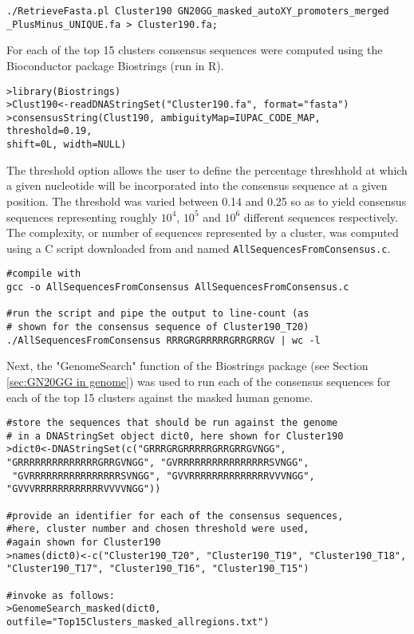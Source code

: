 \begin{small}\begin{lstlisting}
./RetrieveFasta.pl Cluster190 GN20GG_masked_autoXY_promoters_merged
_PlusMinus_UNIQUE.fa > Cluster190.fa;
\end{lstlisting}\end{small}

For each of the top 15 clusters consensus sequences were computed using the Bioconductor package Biostrings (run in R).

\begin{small}\begin{lstlisting}
>library(Biostrings)
>Clust190<-readDNAStringSet("Cluster190.fa", format="fasta") 
>consensusString(Clust190, ambiguityMap=IUPAC_CODE_MAP, threshold=0.19,
shift=0L, width=NULL) 
\end{lstlisting}\end{small}

The threshold option allows the user to define the percentage threshhold at which a given nucleotide will be incorporated into the consensus sequence at a given position. The threshold was varied between 0.14 and 0.25 so as to yield consensus sequences representing roughly $10^4$, $10^5$ and $10^6$ different sequences respectively. The complexity, or number of sequences represented by a cluster, was computed using a C script downloaded from \cite{Lindenbaum:Online} and named \verb|AllSequencesFromConsensus.c|.

\begin{small}\begin{lstlisting}
#compile with
gcc -o AllSequencesFromConsensus AllSequencesFromConsensus.c

#run the script and pipe the output to line-count (as 
# shown for the consensus sequence of Cluster190_T20)
./AllSequencesFromConsensus RRRGRGRRRRRGRRGRRGV | wc -l
\end{lstlisting}\end{small}

Next, the "GenomeSearch" function of the Biostrings package (see Section \ref{sec:GN20GG in genome}) was used to run each of the consensus sequences for each of the top 15 clusters against the masked human genome. 

\begin{small}\begin{lstlisting}
#store the sequences that should be run against the genome
# in a DNAStringSet object dict0, here shown for Cluster190
>dict0<-DNAStringSet(c("GRRRGRGRRRRRGRRGRRGVNGG", 
"GRRRRRRRRRRRRRRGRRGVNGG", "GVRRRRRRRRRRRRRRRRSVNGG",
 "GVRRRRRRRRRRRRRRRRSVNGG", "GVVRRRRRRRRRRRRRRVVVNGG", "GVVVRRRRRRRRRRRRVVVVNGG"))

#provide an identifier for each of the consensus sequences,
#here, cluster number and chosen threshold were used, 
#again shown for Cluster190 
>names(dict0)<-c("Cluster190_T20", "Cluster190_T19", "Cluster190_T18", "Cluster190_T17", "Cluster190_T16", "Cluster190_T15")

#invoke as follows:
>GenomeSearch_masked(dict0, outfile="Top15Clusters_masked_allregions.txt")
\end{lstlisting}\end{small}

